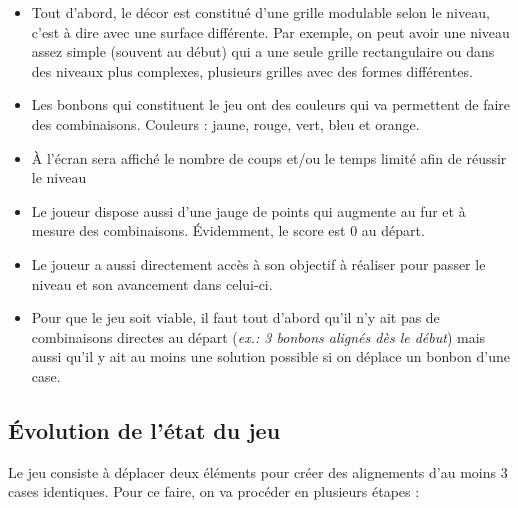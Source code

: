 \begin{itemize}

\item
	Tout d'abord, le décor est constitué d'une grille modulable selon le niveau, c'est à dire avec une surface différente.
	Par exemple, on peut avoir une niveau assez simple (souvent au début) qui a une seule grille rectangulaire ou dans des niveaux plus complexes, plusieurs grilles avec des formes 				différentes.
\item
	Les bonbons qui constituent le jeu ont des couleurs qui va permettent de faire des combinaisons.
	Couleurs : jaune, rouge, vert, bleu et orange.
\item
	À l'écran sera affiché le nombre de coups et/ou le temps limité afin de réussir le niveau
\item
	Le joueur dispose aussi d'une jauge de points qui augmente au fur et à mesure des combinaisons.
	Évidemment, le score est 0 au départ.
\item
	Le joueur a aussi directement accès à son objectif à réaliser pour passer le niveau et son avancement dans celui-ci.
\item 
	Pour que le jeu soit viable, il faut tout d'abord qu'il n'y ait pas de combinaisons directes au départ (\emph{ex.: 3 bonbons alignés dès le début}) mais aussi qu'il y ait au moins une solution 			possible si on déplace un bonbon d'une case.
	
\end{itemize}

\subsection{Évolution de l'état du jeu}

Le jeu consiste à déplacer deux éléments pour créer des alignements d'au moins 3 cases identiques. Pour ce faire, on va procéder en plusieurs étapes :


